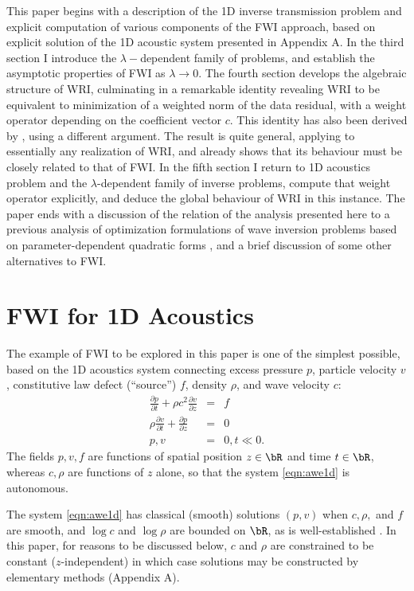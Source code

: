 This paper begins with a description of the 1D inverse transmission
problem and explicit computation of various components of the FWI
approach, based on explicit solution of the 1D acoustic system
presented in Appendix A. In the third section I introduce the
$\lambda-$dependent family of problems, and establish the asymptotic
properties of FWI as $\lambda \rightarrow 0$. The fourth section
develops the algebraic structure of WRI, culminating in a remarkable
identity revealing WRI to be equivalent to minimization of a weighted
norm of the data residual, with a weight operator depending on the
coefficient vector $c$. This identity has also been derived by
\cite{Leeuwen2019note}, using a different argument. The result is
quite general, applying to essentially any realization of WRI, and
already shows that its behaviour must be closely related to that of
FWI. In the fifth section I return to 1D acoustics problem and the
$\lambda$-dependent family of inverse problems, compute that weight
operator explicitly, and deduce the global behaviour of WRI in this
instance. The paper ends with a discussion of the
relation of the analysis presented here to a previous analysis of
optimization formulations of wave inversion problems based on
parameter-dependent quadratic forms \cite[]{StolkSymes:03}, and a
brief discussion of some other alternatives to FWI.

\section{FWI for 1D Acoustics}
The example of FWI to be explored in this paper is one of the simplest possible, based on the 1D acoustics system connecting excess pressure $p$, particle velocity $v$, constitutive law defect (``source'') $f$, density $\rho$, and wave velocity $c$:
\begin{eqnarray}
\label{eqn:awe1d}
\frac{\partial p}{\partial t} + \rho c^2\frac{\partial 
  v}{\partial z} &=& f \nonumber\\
\rho \frac{\partial v}{\partial t} + \frac{\partial p}{\partial 
  z}&=&0\nonumber\\
 p,v&=&0, t \ll 0. 
\end{eqnarray}
The fields $p,v,f$ are functions of spatial position $z \in \bR$ and time $t \in \bR$, whereas $c, \rho$ are functions of $z$ alone, so that the system \ref{eqn:awe1d} is autonomous.

The system \ref{eqn:awe1d} has classical (smooth) solutions $(p,v)$
when $c, \rho,$ and $f$ are smooth, and $\log c$ and $\log \rho$ are
bounded on $\bR$, as is well-established \cite[]{Lax:PDENotes}. In
this paper, for reasons to be discussed below, $c$ and $\rho$ are
constrained to be constant ($z$-independent) in which case solutions
may be constructed by elementary methods (Appendix A). 

